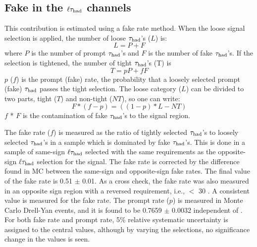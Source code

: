 \subsection{\texorpdfstring{Fake \Tau in the $\ell\tau_{\rm had}$ channels}{Fake tau the in lepton-tau channels}}
\label{sect:bkgFake}
This contribution is estimated using a fake rate method.
When the loose signal selection is applied, the number of loose $\tau_{\rm had}$'s ($L$) is:
\begin{equation}
L = P + F
\end{equation}
where $P$ is the number of prompt $\tau_{\rm had}$'s and $F$ is the number of fake 
$\tau_{\rm had}$'s. If the selection is tightened, the number of tight $\tau_{\rm had}$'s (T) is
\begin{equation}
 T = pP + fF
\end{equation} 
$p$ ($f$) is the prompt (fake) rate, the probability that a loosely selected prompt (fake) $\tau_{\rm had}$ passes the  tight  selection. 
The loose category ($L$) can be divided to two parts, 
tight ($T$) and non-tight ($NT$), so one can write:
\begin{equation}
   F * (f - p) = ((1 - p) * L - NT)
\end{equation}
$f$ * $F$ is the contamination of fake $\tau_{\rm had}$'s to the signal region. 

The fake rate ($f$) is measured as the ratio of tightly selected $\tau_{\rm had}$'s to loosely 
selected $\tau_{\rm had}$'s in a sample which is dominated by fake $\tau_{\rm had}$'s. This is done in a sample of same-sign $\ell\tau_{\rm had}$ selected 
with the same requirements as the opposite-sign $\ell\tau_{\rm had}$
selection for the signal.
The fake rate is corrected by the difference found in MC between the 
same-sign and opposite-sign fake rates.
The final value of the fake rate is 0.51 $\pm$ 0.01. 
As a cross check, the fake rate was also measured in an opposite sign region with a reversed
\MET requirement, i.e., \MET $<$ 30 \GeV.
A consistent value is measured for the fake rate.  
The prompt rate ($p$) is measured in Monte Carlo Drell-Yan events, and it is found to 
be 0.7659 $\pm$ 0.0032 independent of \mttwo. 
For both fake rate and prompt rate, 5\% relative systematic uncertainty is assigned to the central values, although 
by varying the selections, no significance change in the values is seen.

